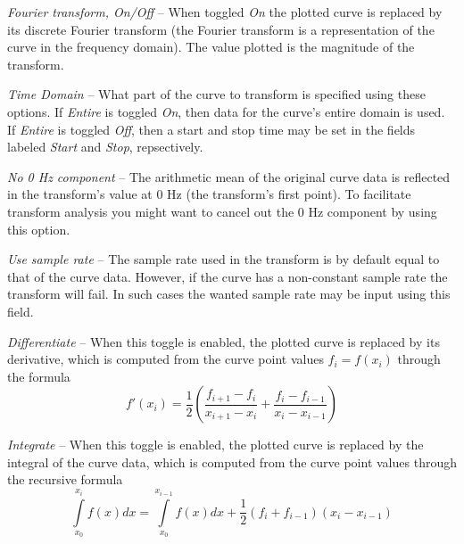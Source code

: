 \begin{bulletlist}
\item{\sl Fourier transform, On/Off} --
  When toggled {\sl On} the plotted curve is replaced by its discrete
  Fourier transform (the Fourier transform is a representation of the curve
  in the frequency domain). The value plotted is the magnitude of the transform.


\item{\sl Time Domain} --
  What part of the curve to transform is specified using these options.
  If {\sl Entire} is toggled {\sl On}, then data for the curve's entire domain
  is used. If {\sl Entire} is toggled {\sl Off}, then a start and stop time
  may be set in the fields labeled {\sl Start} and {\sl Stop}, repsectively.

\item{\sl No 0 Hz component} --
  The arithmetic mean of the original curve data is reflected in the transform's
  value at 0 Hz (the transform's first point). To facilitate transform analysis
  you might want to cancel out the 0 Hz component by using this option.

\item{\sl Use sample rate} --
  The sample rate used in the transform is by default equal to that of the curve
  data. However, if the curve has a non-constant sample rate the transform will
  fail. In such cases the wanted sample rate may be input using this field.

\item{\sl Differentiate} --
  When this toggle is enabled, the plotted curve is replaced by its derivative,
  which is computed from the curve point values $f_i=f(x_i)$ through the formula
  $$
    f'(x_i) = \frac{1}{2}\left( \frac{f_{i+1}-f_{i}}{x_{i+1}-x_{i}} +
                                \frac{f_{i}-f_{i-1}}{x_{i}-x_{i-1}} \right)
  $$

\item{\sl Integrate} --
  When this toggle is enabled, the plotted curve is replaced by the integral of
  the curve data, which is computed from the curve point values through the
  recursive formula
  $$
    \int\limits_{x_0}^{x_i}f(x)dx =
    \int\limits_{x_0}^{x_{i-1}}f(x)dx + \frac{1}{2}(f_i+f_{i-1})(x_i-x_{i-1})
  $$
\end{bulletlist}

